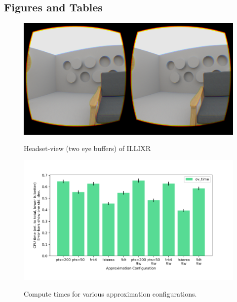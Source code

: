 \subsection{Figures and Tables}

\begin{figure}[H]
  \caption{Headset-view (two eye buffers) of ILLIXR}
  \includegraphics[width=\columnwidth]{illixr.png}
  \label{illixr}
\end{figure}

\begin{figure}[H]
  \caption{Compute times for various approximation configurations.}
  \includegraphics[width=\columnwidth]{times.png}
  \label{compute-times}
\end{figure}

